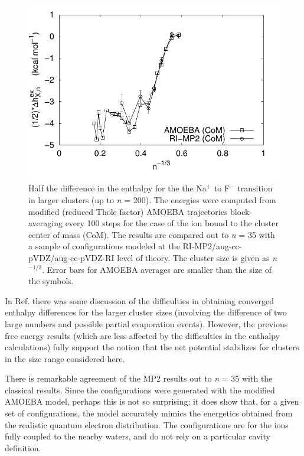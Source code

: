 \begin{cpa}
\begin{figure}
 \begin{center}
  \includegraphics[width=0.98\linewidth]{images/cpa/deltaH_com-eps-converted-to.pdf}
 \end{center}
\caption[Half the enthalpy differences in the Na\sur{+}$\rightarrow$F\sur{-} transition for clusters with the ion fixed at the center of mass]{Half the difference 
in the enthalpy for the the Na$^+$ to F$^-$ transition in larger clusters (up to \emph{n} = 200). The energies were computed from modified (reduced Thole factor) AMOEBA
trajectories block-averaging every 100 steps for the case of the ion bound to the cluster center of mass (CoM). The results are compared out to \emph{n} = 35 with a sample 
of configurations modeled at the RI-MP2/aug-cc-pVDZ/aug-cc-pVDZ-RI level of theory. The cluster size is given as \emph{n}$^{-1/3}$. Error bars for AMOEBA averages are smaller
than the size of the symbols.}
\label{fig:dHcom}
\end{figure}

  In Ref. \cite{pollard2014cpa1} there was some discussion of the difficulties in obtaining converged enthalpy differences for the larger cluster sizes (involving the 
  difference of two large numbers and possible partial evaporation events). However, the previous free energy results (which are less affected by the difficulties in 
  the enthalpy calculations) fully support the notion that the net potential stabilizes for clusters in the size range considered here.  

  There is remarkable agreement of the MP2 results out to \emph{n} = 35 with the classical results. Since the configurations were generated with the modified AMOEBA model, 
  perhaps this is not so surprising; it does show that, for a given set of configurations, the model accurately mimics the energetics obtained from the realistic
  quantum electron distribution. The configurations are for the ions fully coupled to the nearby waters, and do not rely on a particular cavity definition.  


\end{cpa}
